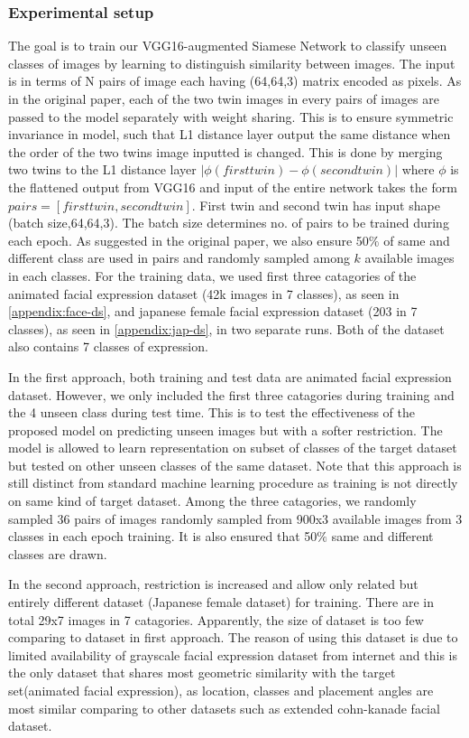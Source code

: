 \documentclass{article}
\begin{document}
\subsubsection{\textbf{Experimental setup}}

The goal is to train our VGG16-augmented Siamese Network to classify unseen classes of images by learning to distinguish similarity between images. The input is in terms of N pairs of image each having (64,64,3) matrix encoded as pixels. As in the original paper, each of the two twin images in every pairs of images are passed to the model separately with weight sharing. This is to ensure symmetric invariance in model, such that L1 distance layer output the same distance when the order of the two twins image inputted is changed. This is done by merging two twins to the L1 distance layer $|\phi(first twin) - \phi(second twin)|$ where $\phi$ is the flattened output from VGG16 and input of the entire network takes the form $pairs = [first twin,second twin]$. First twin and second twin has input shape (batch size,64,64,3). The batch size determines no. of pairs to be trained during each epoch. As suggested in the original paper, we also ensure 50$\%$ of same and different class are used in pairs and randomly sampled among $k$ available images in each classes. For the training data, we used first three catagories of the animated facial expression dataset (42k images in 7 classes), as seen in \ref{appendix:face-ds}, and japanese female facial expression dataset (203 in 7 classes), as seen in \ref{appendix:jap-ds}, in two separate runs. Both of the dataset also contains 7 classes of expression.

In the first approach, both training and test data are animated facial expression dataset. However, we only included the first three catagories during training and the 4 unseen class during test time. This is to test the effectiveness of the proposed model on predicting unseen images but with a softer restriction. The model is allowed to learn representation on subset of classes of the target dataset but tested on other unseen classes of the same dataset. Note that this approach is still distinct from standard machine learning procedure as training is not directly on same kind of target dataset. Among the three catagories, we randomly sampled 36 pairs of images randomly sampled from 900x3 available images from 3 classes in each epoch training. It is also ensured that 50$\%$ same and different classes are drawn.

In the second approach, restriction is increased and allow only related but entirely different dataset (Japanese female dataset) for training. There are in total 29x7 images in 7 catagories. Apparently, the size of dataset is too few comparing to dataset in first approach. The reason of using this dataset is due to limited availability of grayscale facial expression dataset from internet and this is the only dataset that shares most geometric similarity with the target set(animated facial expression), as location, classes and placement angles are most similar comparing to other datasets such as extended cohn-kanade facial dataset.
\end{document}
